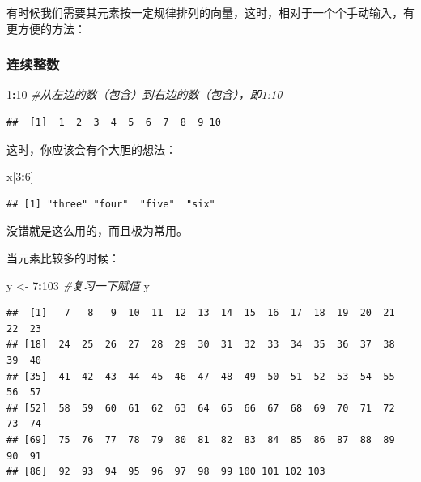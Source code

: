 \documentclass[]{book}
\newenvironment{Shaded}{\begin{snugshade}}{\end{snugshade}}
\newcommand{\CommentTok}[1]{\textcolor[rgb]{0.56,0.35,0.01}{\textit{#1}}}
\newcommand{\DecValTok}[1]{\textcolor[rgb]{0.00,0.00,0.81}{#1}}
\newcommand{\NormalTok}[1]{#1}
\newcommand{\OperatorTok}[1]{\textcolor[rgb]{0.81,0.36,0.00}{\textbf{#1}}}
\newcommand{\StringTok}[1]{\textcolor[rgb]{0.31,0.60,0.02}{#1}}
\begin{document}
有时候我们需要其元素按一定规律排列的向量，这时，相对于一个个手动输入，有更方便的方法：

\subsubsection{连续整数}

\begin{Shaded}
\begin{Highlighting}[]
\DecValTok{1}\OperatorTok{:}\DecValTok{10} \CommentTok{#从左边的数（包含）到右边的数（包含），即1:10}
\end{Highlighting}
\end{Shaded}

\begin{verbatim}
##  [1]  1  2  3  4  5  6  7  8  9 10
\end{verbatim}

这时，你应该会有个大胆的想法：

\begin{Shaded}
\begin{Highlighting}[]
\NormalTok{x[}\DecValTok{3}\OperatorTok{:}\DecValTok{6}\NormalTok{]}
\end{Highlighting}
\end{Shaded}

\begin{verbatim}
## [1] "three" "four"  "five"  "six"
\end{verbatim}

没错就是这么用的，而且极为常用。

当元素比较多的时候：

\begin{Shaded}
\begin{Highlighting}[]
\NormalTok{y <-}\StringTok{ }\DecValTok{7}\OperatorTok{:}\DecValTok{103} \CommentTok{#复习一下赋值}
\NormalTok{y}
\end{Highlighting}
\end{Shaded}

\begin{verbatim}
##  [1]   7   8   9  10  11  12  13  14  15  16  17  18  19  20  21  22  23
## [18]  24  25  26  27  28  29  30  31  32  33  34  35  36  37  38  39  40
## [35]  41  42  43  44  45  46  47  48  49  50  51  52  53  54  55  56  57
## [52]  58  59  60  61  62  63  64  65  66  67  68  69  70  71  72  73  74
## [69]  75  76  77  78  79  80  81  82  83  84  85  86  87  88  89  90  91
## [86]  92  93  94  95  96  97  98  99 100 101 102 103
\end{verbatim}
\end{document}
